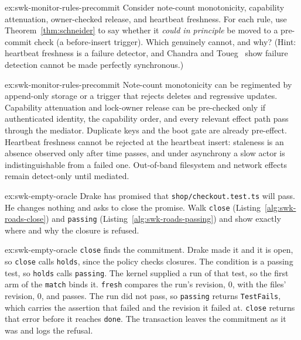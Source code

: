 \documentclass[11pt,a4paper]{article}
\theoremstyle{definition}
\theoremstyle{remark}
\begin{document}

\begin{pdexercise}[kind=Check,rating=1]{ex:swk-monitor-rules-precommit}
Consider note-count monotonicity, capability attenuation, owner-checked release, and heartbeat freshness. For each rule, use Theorem~\ref{thm:schneider} to say whether it \emph{could in principle} be moved to a pre-commit check (a before-insert trigger). Which genuinely cannot, and why? (Hint: heartbeat freshness is a failure detector, and Chandra and Toueg~ show failure detection cannot be made perfectly synchronous.)
\end{pdexercise}
\begin{pdsolution}{ex:swk-monitor-rules-precommit}
Note-count monotonicity can be regimented by append-only storage or a trigger that rejects deletes and regressive updates. Capability attenuation and lock-owner release can be pre-checked only if authenticated identity, the capability order, and every relevant effect path pass through the mediator. Duplicate keys and the boot gate are already pre-effect. Heartbeat freshness cannot be rejected at the heartbeat insert: staleness is an absence observed only after time passes, and under asynchrony a slow actor is indistinguishable from a failed one. Out-of-band filesystem and network effects remain detect-only until mediated.
\end{pdsolution}
\begin{pdexercise}[kind=Trace,rating=2]{ex:swk-empty-oracle}
Drake has promised that \texttt{shop/checkout.test.ts} will pass. He changes nothing and asks to close the promise. Walk \texttt{close} (Listing~\ref{alg:swk-roads-close}) and \texttt{passing} (Listing~\ref{alg:swk-roads-passing}) and show exactly where and why the closure is refused.
\end{pdexercise}
\begin{pdsolution}{ex:swk-empty-oracle}
\texttt{close} finds the commitment. Drake made it and it is open, so \texttt{close} calls \texttt{holds}, since the policy checks closures. The condition is a passing test, so \texttt{holds} calls \texttt{passing}. The kernel supplied a run of that test, so the first arm of the \texttt{match} binds it. \texttt{fresh} compares the run's revision, 0, with the files' revision, 0, and passes. The run did not pass, so \texttt{passing} returns \texttt{TestFails}, which carries the assertion that failed and the revision it failed at. \texttt{close} returns that error before it reaches \texttt{done}. The transaction leaves the commitment as it was and logs the refusal.
\end{pdsolution}
\end{document}
